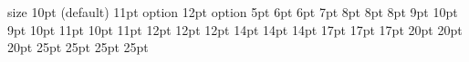 size             10pt (default)   11pt option      12pt option 
\tiny            5pt              6pt              6pt 
\scriptsize      7pt              8pt              8pt 
\footnotesize    8pt              9pt              10pt 
\small           9pt              10pt             11pt 
\normalsize      10pt             11pt             12pt 
\large           12pt             12pt             14pt 
\Large           14pt             14pt             17pt 
\LARGE           17pt             17pt             20pt 
\huge            20pt             20pt             25pt 
\Huge            25pt             25pt             25pt